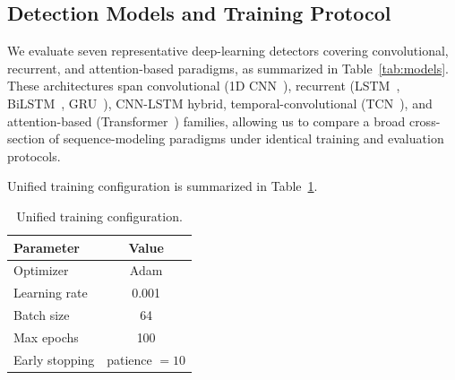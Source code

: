 \documentclass{ieeeaccess}
\begin{document}
\subsection{Detection Models and Training Protocol}

We evaluate seven representative deep-learning detectors covering convolutional, recurrent, and attention-based paradigms, as summarized in Table~\ref{tab:models}. These architectures span convolutional (1D CNN~\cite{ref39}), recurrent (LSTM~\cite{ref40}, BiLSTM~\cite{ref41}, GRU~\cite{ref42}), CNN-LSTM hybrid, temporal-convolutional (TCN~\cite{ref43}), and attention-based (Transformer~\cite{ref44}) families, allowing us to compare a broad cross-section of sequence-modeling paradigms under identical training and evaluation protocols.

\begin{table}[!t]
\caption{Evaluated detection models and characteristics.}
\label{tab:models}
\centering
{}
\end{table}

Unified training configuration is summarized in Table~\ref{tab:training-config}.

\begin{table}[!t]
\caption{Unified training configuration.}
\label{tab:training-config}
\centering
\begin{tabular}{lc}
\hline
\textbf{Parameter} & \textbf{Value} \\
\hline
Optimizer & Adam \\
Learning rate & 0.001 \\
Batch size & 64 \\
Max epochs & 100 \\
Early stopping & patience $= 10$ \\
\hline
\end{tabular}
\end{table}
\end{document}
